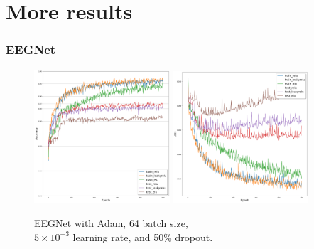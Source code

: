 \chapter{More results}
\subsection{EEGNet}\label{results-eegnet}
	\begin{figure}[H]
		\centering
		\includegraphics[width=0.45\textwidth]{results/eegnet_adam_64_0.005_0.5_acc.png}
		\includegraphics[width=0.45\textwidth]{results/eegnet_adam_64_0.005_0.5_loss.png}
		\caption{EEGNet with Adam, 64 batch size, \\ $5 \times 10^{-3}$ learning rate, and 50\% dropout.}
   	\end{figure}
